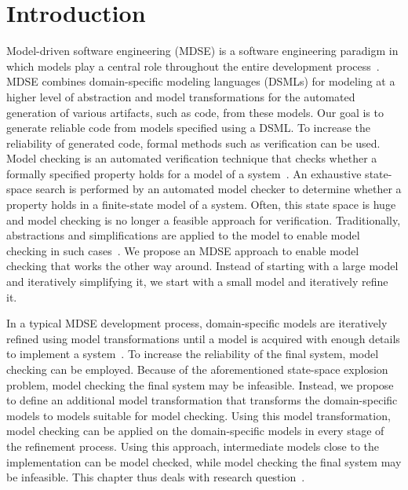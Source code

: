 \section{Introduction}
\label{sec:exploring-boundaries:Introduction}
Model-driven software engineering (MDSE) is a software engineering paradigm in which models play a central role throughout the entire development process~\cite{Schmidt2006}.
MDSE combines domain-specific modeling languages (DSMLs) for modeling at a higher level of abstraction and model transformations for the automated generation of various artifacts, such as code, from these models.
Our goal is to generate reliable code from models specified using a DSML.
To increase the reliability of generated code, formal methods such as verification can be used.
Model checking is an automated verification technique that checks whether a formally specified property holds for a model of a system~\cite{Clarke1999}.
An exhaustive state-space search is performed by an automated model checker to determine whether a property holds in a finite-state model of a system.
Often, this state space is huge and model checking is no longer a feasible approach for verification.
Traditionally, abstractions and simplifications are applied to the model to enable model checking in such cases~\cite{Chan1998,Clarke1994,Wing1995}.
We propose an MDSE approach to enable model checking that works the other way around.
Instead of starting with a large model and iteratively simplifying it, we start with a small model and iteratively refine it.

In a typical MDSE development process, domain-specific models are iteratively refined using model transformations until a model is acquired with enough details to implement a system~\cite{Kurtev2003}.
To increase the reliability of the final system, model checking can be employed.
Because of the aforementioned state-space explosion problem, model checking the final system may be infeasible.
Instead, we propose to define an additional model transformation that transforms the domain-specific models to models suitable for model checking.
Using this model transformation, model checking can be applied on the domain-specific models in every stage of the refinement process.
Using this approach, intermediate models close to the implementation can be model checked, while model checking the final system may be infeasible.
This chapter thus deals with research question~.

\RQTwo

